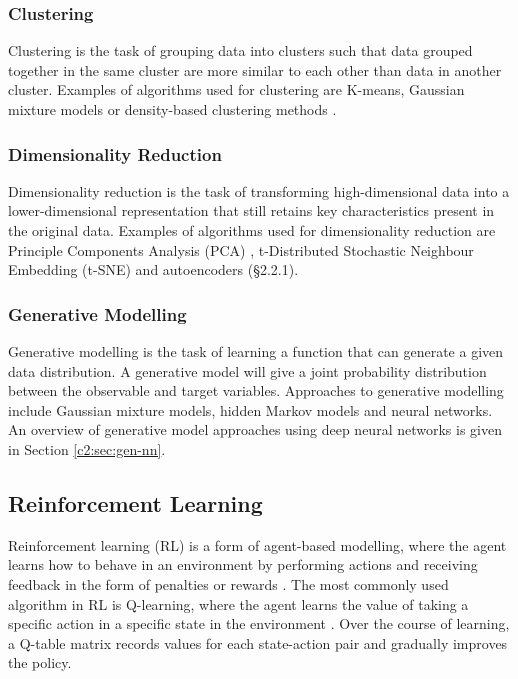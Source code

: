 \subsubsection{Clustering}

Clustering is the task of grouping data into clusters such that data grouped together in the same cluster are more similar to each other than data in another cluster. 
Examples of algorithms used for clustering are K-means, Gaussian mixture models or density-based clustering methods \citep{xu2005survey}.

\subsubsection{Dimensionality Reduction}

Dimensionality reduction is the task of transforming high-dimensional data into a lower-dimensional representation that still retains key characteristics present in the original data. 
Examples of algorithms used for dimensionality reduction are Principle Components Analysis (PCA) \citep{pearson1901liii}, t-Distributed Stochastic Neighbour Embedding (t-SNE) \citep{hinton2002stochastic} and autoencoders (\S2.2.1). 

\subsubsection{Generative Modelling}

Generative modelling is the task of learning a function that can generate a given data distribution. 
A generative model will give a joint probability distribution between the observable and target variables. 
Approaches to generative modelling include Gaussian mixture models, hidden Markov models and neural networks. 
An overview of generative model approaches using deep neural networks is given in Section \ref{c2:sec:gen-nn}.

\subsection{Reinforcement Learning}
\label{c2:subsec:reinforcement}

Reinforcement learning (RL) is a form of agent-based modelling, where the agent learns how to behave in an environment by performing actions and receiving feedback in the form of penalties or rewards \citep{sutton1999reinforcement}. 
The most commonly used algorithm in RL is Q-learning, where the agent learns the value of taking a specific action in a specific state in the environment \citep{watkins1992q}.
Over the course of learning, a Q-table matrix records values for each state-action pair and gradually improves the policy.

